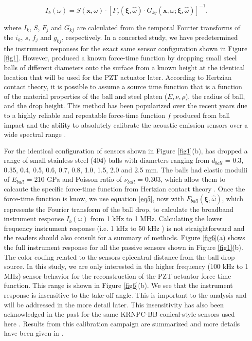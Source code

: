 \documentclass[preprint,3p, 11pt,authoryear]{elsarticle}
\begin{document}
{\begin{equation}
    \label{eq5}
        I_{k}\left(\omega \right) = 
        S\left( \mathbf{x}, \omega \right) \cdot \left[ F_{j}\left( \mathbf{\xi}, \hat{\omega} \right) \cdot G_{kj}\left( \mathbf{x}, \omega; \mathbf{\xi}, \hat{\omega} \right)\right]^{-1} .
\end{equation}

\noindent where $I_{k}$, $S$, $F_{j}$ and $G_{kj}$ are calculated from the temporal Fourier transforms of the $i_{k}$, $s$, $f_{j}$ and $g_{kj}$, respectively.  In a concerted study, we have predetermined the instrument responses for the exact same sensor configuration shown in Figure \ref{fig1}.  However, \citet{Wu2020} produced a known force-time function by dropping small steel balls of different diameters onto the surface from a known height at the identical location that will be used for the PZT actuator later. According to Hertzian contact theory, it is possible to assume a source time function that is a function of the material properties of the ball and steel platen ($E, \nu, \rho$), the radius of ball, and the drop height. This method has been popularized over the recent years due to a highly reliable and repeatable force-time function $f$ produced from ball impact and the ability to absolutely calibrate the acoustic emission sensors over a wide spectral range \citep{Breckenridge1990, McLaskey2010, McLaskey2012, McLaskey2015}. 

For the identical configuration of sensors shown in Figure \ref{fig1}(b), \citet{Wu2020} has dropped a range of small stainless steel (404) balls with diameters ranging from $d_{ball}$ = 0.3, 0.35, 0.4, 0.5, 0.6, 0.7, 0.8, 1.0, 1.5, 2.0 and 2.5 mm. The balls had elastic modulii of $E_{ball}$ = 210 GPa and Poisson ratio of $\nu_{ball}$ = 0.303, which allow them to calcaute the specific force-time function from Hertzian contact theory \citep[see also e.g.][]{McLaskey2010, McLaskey2012}. Once the force-time function is know, we use equation \eqref{eq5}, now with $F_{ball}\left( \mathbf{\xi}, \hat{\omega} \right)$, which represents the Fourier transform of the ball drop, to calculate the broadband instrument response $I_{k}(\omega)$ from 1 kHz to 1 MHz.  Calculating the lower frequency instrument response (i.e. 1 kHz to 50 kHz ) is not straightforward and the readers should also consult \citet{Wu2018} for a summary of methods. Figure \ref{fig6}(a) shows the full instrument response for all the passive sensors shown in Figure \ref{fig1}(b). The color coding related to the sensors epicentral distance from the ball drop source. In this study, we are only interested in the higher frequency (100 kHz to 1 MHz) sensor behavior for the reconstruction of the PZT actuator force time function. This range is shown in Figure \ref{fig6}(b). We see that the instrument response is insensitive to the take-off angle. This is important to the analysis and will be addressed in the more detail later. This insensitivity has also been acknowledged in the past for the same KRNPC-BB conical-style sensors used here \citep{Goodfellow2015, Selvadurai2019}.  Results from this calibration campaign are summarized and more details have been given in \citet{Wu2020}.


}
\end{document}
